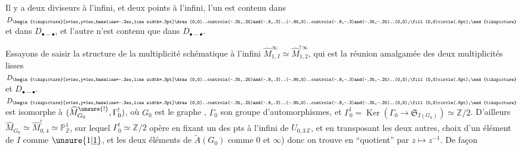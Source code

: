 Il y a deux diviseurs à l'infini,  et deux points  à l'infini,  l'un  est contenu dans $D_{\begin{tikzpicture}[x=1ex,y=1ex,baseline=-.2ex,line width=.3pt]\draw (0,0)..controls(-.35,.25)and(-.9,.3)..(-.95,0)..controls(-.9,-.3)and(-.35,-.25)..(0,0);\fill(0,0)circle(.6pt);\end{tikzpicture}}$ et dans $D_{\bullet-\bullet}$, et l'autre n'est contenu que dans $D_{\bullet-\bullet}$.

Essayons de  saisir la structure de la multiplicité schématique à l'infini $\widehat M^\infty_{1,I}\simeq\widehat M^{!\,\infty}_{1,2}$, qui est la réunion amalgamée des deux multiplicités lisses  $D_{\begin{tikzpicture}[x=1ex,y=1ex,baseline=-.2ex,line width=.3pt]\draw (0,0)..controls(-.35,.25)and(-.9,.3)..(-.95,0)..controls(-.9,-.3)and(-.35,-.25)..(0,0);\fill(0,0)circle(.6pt);\end{tikzpicture}}$ et $D_{\bullet-\bullet}$.
$D_{\begin{tikzpicture}[x=1ex,y=1ex,baseline=-.2ex,line width=.3pt]\draw (0,0)..controls(-.35,.25)and(-.9,.3)..(-.95,0)..controls(-.9,-.3)and(-.35,-.25)..(0,0);\fill(0,0)circle(.6pt);\end{tikzpicture}}$ est isomorphe à $(\widehat M^{\unsure{!}}_{G_0},\Gamma^!_0)$, où $G_0$ est le graphe
,
$\Gamma_0$ son groupe d'automorphismes, et $\Gamma^!_0=\operatorname{Ker}(\Gamma_0\longrightarrow\mathfrak S_{I(G_0)})\simeq\mathbb Z/2$.
D'ailleurs $\widehat M_{G_0}\simeq\widehat M^!_{0,4}\simeq\mathbb P^1_{\mathbb Z}$, sur lequel $\Gamma^!_0\simeq\mathbb Z/2$ opère en fixant un des  pts à l'infini de $U_{0,3\,\mathbb Z}$,  et en transposant les deux autres,    choix d'un élément de $I$ comme $\unsure{1|\underline 1}$, et les deux éléments de $\widetilde A(G_0)$ comme $0$ et $\infty$) donc on trouve en ``quotient'' par $z\longmapsto z^{-1}$. De façon

